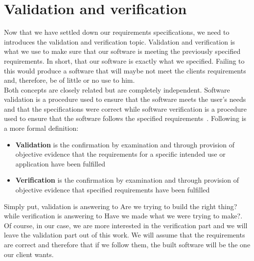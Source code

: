 \documentclass[12pt]{article}
\theoremstyle{definition}
\theoremstyle{definition}
\theoremstyle{remark}
\begin{document}

\section{Validation and verification}


Now that we have settled down our requirements specifications, we need to introduces the validation and verification topic. Validation and verification is what we use to make sure that our software is meeting the previously specified requirements. In short, that our software is exactly what we specified. Failing to this would produce a software that will maybe not meet the clients requirements and, therefore, be of little or no use to him.\\

Both concepts are closely related but are completely independent. Software validation is a procedure used to ensure that the software meets the user's needs and that the specifications were correct while software verification is a procedure used to ensure that the software follows the specified requirements~\cite{VnV:2016}. Following is a more formal definition:

\begin{itemize}

\item \textbf{Validation} is the confirmation by examination and through provision of objective evidence that the requirements for a specific intended use or application have been fulfilled~\cite{IEEEStd1990}
\item \textbf{Verification} is the confirmation by examination and through provision of objective evidence that specified requirements have been fulfilled~\cite{IEEEStd1990}

\end{itemize}

Simply put, validation is answering to \guillemotleft Are we trying to build the right thing?\guillemotright while verification is answering to \guillemotleft Have we made what we were trying to make?\guillemotright. Of course, in our case, we are more interested in the verification part and we will leave the validation part out of this work. We will assume that the requirements are correct and therefore that if we follow them, the built software will be the one our client wants.
\end{document}
